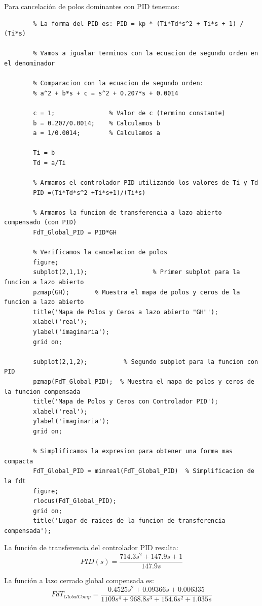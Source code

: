 \documentclass[12pt]{article}
\begin{document}
	Para cancelación de polos dominantes con PID tenemos:
	\begin{lstlisting}
		% La forma del PID es: PID = kp * (Ti*Td*s^2 + Ti*s + 1) / (Ti*s)
		
		% Vamos a igualar terminos con la ecuacion de segundo orden en el denominador
		
		% Comparacion con la ecuacion de segundo orden:
		% a^2 + b*s + c = s^2 + 0.207*s + 0.0014
		
		c = 1;               % Valor de c (termino constante)
		b = 0.207/0.0014;    % Calculamos b
		a = 1/0.0014;        % Calculamos a
		
		Ti = b              
		Td = a/Ti        
		
		% Armamos el controlador PID utilizando los valores de Ti y Td
		PID =(Ti*Td*s^2 +Ti*s+1)/(Ti*s) 
		
		% Armamos la funcion de transferencia a lazo abierto compensado (con PID)
		FdT_Global_PID = PID*GH
		
		% Verificamos la cancelacion de polos
		figure;
		subplot(2,1,1);                  % Primer subplot para la funcion a lazo abierto
		pzmap(GH);       % Muestra el mapa de polos y ceros de la funcion a lazo abierto
		title('Mapa de Polos y Ceros a lazo abierto "GH"');
		xlabel('real');
		ylabel('imaginaria');
		grid on;
		
		subplot(2,1,2);          % Segundo subplot para la funcion con PID
		pzmap(FdT_Global_PID);  % Muestra el mapa de polos y ceros de la funcion compensada
		title('Mapa de Polos y Ceros con Controlador PID');
		xlabel('real');
		ylabel('imaginaria');
		grid on;      
		
		% Simplificamos la expresion para obtener una forma mas compacta
		FdT_Global_PID = minreal(FdT_Global_PID)  % Simplificacion de la fdt
		figure;
		rlocus(FdT_Global_PID);         
		grid on;                          
		title('Lugar de raices de la funcion de transferencia compensada');
	\end{lstlisting}
	
	La función de transferencia del controlador PID resulta:
	\begin{equation}
		PID(s)=\frac{714.3s^2 + 147.9s + 1}{147.9s}
	\end{equation}
	
	La función a lazo cerrado global compensada es:
	\begin{equation}
		FdT_{GlobalComp}=\frac{0.4525s^2 + 0.09366s + 0.006335}{1109s^4 + 968.8s^3 + 154.6s^2 + 1.035s}
	\end{equation} 
	
\end{document}

